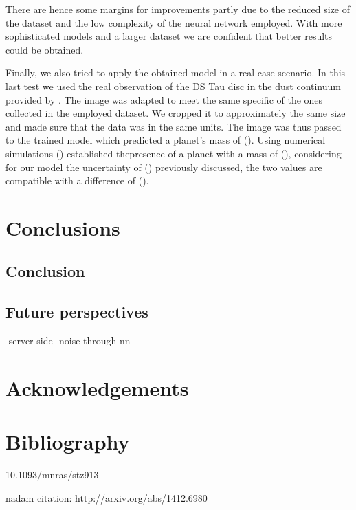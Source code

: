 \documentclass[a4paper,10pt]{report}
\begin{document}
There are hence some margins for improvements partly due to the reduced size of
the dataset and the low complexity of the neural network employed. With more sophisticated models and
a larger dataset we are confident that better results could be obtained.

Finally, we also tried to apply the obtained model in a real-case scenario. In this last test we used
the real observation of the DS Tau disc in the dust continuum provided by .
The image was adapted to meet the same specific of the ones collected in the employed dataset. We cropped it to
approximately the same size and made sure that the data was in the same units.
The image was thus passed to the trained model which predicted a planet's mass of ().
Using numerical simulations () established thepresence of a planet with a mass of (),
considering for our model the uncertainty of () previously discussed, the two values are compatible 
with a difference of ().

\chapter{Conclusions}
\section{Conclusion}
\section{Future perspectives}

-server side
-noise through nn

\chapter*{Acknowledgements}

\chapter*{Bibliography}

10.1093/mnras/stz913

nadam citation: http://arxiv.org/abs/1412.6980
\end{document}
